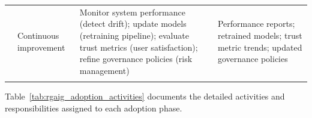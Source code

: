 \begin{xltabular}{\textwidth}{@{} c p{0.17\textwidth} X X @{}}
 & Continuous improvement & Monitor system performance (detect drift); update models (retraining pipeline); evaluate trust metrics (user satisfaction); refine governance policies (risk management) & Performance reports; retrained models; trust metric trends; updated governance policies \\
\addlinespace
\midrule
{} \\
\end{xltabular}
\endgroup

\vspace{1.5em}

Table~\ref{tab:rgaig_adoption_activities} documents the detailed activities and responsibilities assigned to each adoption phase.

